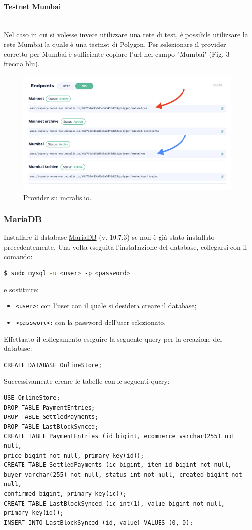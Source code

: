 \documentclass[a4paper, 12pt]{article}
\begin{document}
\paragraph{Testnet Mumbai}\\
Nel caso in cui si volesse invece utilizzare una rete di test, è possibile utilizzare la rete Mumbai la quale è una testnet di Polygon. Per selezionare il provider corretto per Mumbai è sufficiente copiare l'url nel campo "Mumbai" (Fig. 3 freccia blu).
\FloatBarrier
\begin{figure}[!h]
\centering
\includegraphics[width=0.6\linewidth]{img/moralis.png}
\caption{Provider su moralis.io.}
\end{figure}
\FloatBarrier
\subsubsection{MariaDB}
\label{sec:db}
Installare il database \href{https://mariadb.org/download/}{MariaDB} (v. 10.7.3) se non è già stato installato precedentemente. Una volta eseguita l'installazione del database, collegarsi con il comando:
\begin{lstlisting}[language=bash]
  $ sudo mysql -u <user> -p <password>
\end{lstlisting}
e sostituire:
\begin{itemize}
  \item \verb|<user>|: con l'user con il quale si desidera creare il database;
  \item \verb|<password>|: con la password dell'user selezionato.
\end{itemize}
Effettuato il collegamento eseguire la seguente query per la creazione del database:
\begin{verbatim}
CREATE DATABASE OnlineStore;
\end{verbatim}
Successivamente creare le tabelle con le seguenti query:
\begin{verbatim}
USE OnlineStore;
DROP TABLE PaymentEntries;
DROP TABLE SettledPayments;
DROP TABLE LastBlockSynced;
CREATE TABLE PaymentEntries (id bigint, ecommerce varchar(255) not null,
price bigint not null, primary key(id));
CREATE TABLE SettledPayments (id bigint, item_id bigint not null,
buyer varchar(255) not null, status int not null, created bigint not null,
confirmed bigint, primary key(id));
CREATE TABLE LastBlockSynced (id int(1), value bigint not null, primary key(id));
INSERT INTO LastBlockSynced (id, value) VALUES (0, 0);
\end{verbatim}
\end{document}
